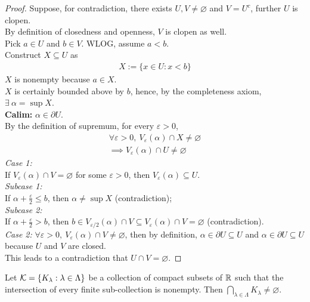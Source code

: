 \documentclass[11pt]{article}
\begin{document}
 	\begin{proof}
 		Suppose, for contradiction, there exists $U, V \neq \varnothing$ and $V = U^c$, further $U$ is clopen. \\
 		By definition of closedness and openness, $V$ is clopen as well. \\
 		Pick $a \in U$ and $b \in V$. WLOG, assume $a < b$. \\
 		Construct $X \subseteq U$ as
 		\begin{align}
 			X := \{x \in U: x < b\}
 		\end{align}
 		$X$ is nonempty because $a \in X$.\\
 		$X$ is certainly bounded above by $b$, hence, by the completeness axiom, $\exists\ \alpha = \sup X$. \\
 		\textbf{Calim:} $\alpha \in \partial U$.\\
 		By the definition of supremum, for every $\varepsilon > 0$, 
 		\begin{align}
 			\forall \varepsilon > 0,\ V_\varepsilon(\alpha) \cap X \neq \varnothing \\
 			\implies V_\varepsilon(\alpha) \cap U \neq \varnothing
 		\end{align}
 		\emph{Case 1:} \\
 		If $V_\varepsilon(\alpha) \cap V = \varnothing$ for some $\varepsilon > 0$, then $V_\varepsilon(\alpha) \subseteq U$. \\
 		\emph{Subcase 1:} \\
 		If $\alpha + \frac{\varepsilon}{2} \leq b$, then $\alpha \neq \sup X$ (contradiction); \\
 		\emph{Subcase 2:} \\
 		If $\alpha + \frac{\varepsilon}{2} > b$, then $b \in V_{\varepsilon/2}(\alpha) \cap V \subseteq V_\varepsilon(\alpha) \cap V = \varnothing$ (contradiction).\\
 		\emph{Case 2:}
 		$\forall \varepsilon > 0,\ V_\varepsilon(\alpha) \cap V \neq \varnothing$, then by definition, $\alpha \in \partial U \subseteq U$ and $\alpha \in \partial U \subseteq U$ because $U$ and $V$ are closed. \\
 		This leads to a contradiction that $U \cap V = \varnothing$.
 	\end{proof}
 	
 	\begin{proposition}
 		Let $\mathcal{{K}} = \{K_\lambda: \lambda \in \Lambda \}$ be a collection of compact subsets of $\mathbb{R}$ such that the intersection of every finite sub-collection is nonempty. Then $\bigcap_{\lambda \in \Lambda} K_\lambda \neq \varnothing$.
 	\end{proposition}
 	
\end{document}
